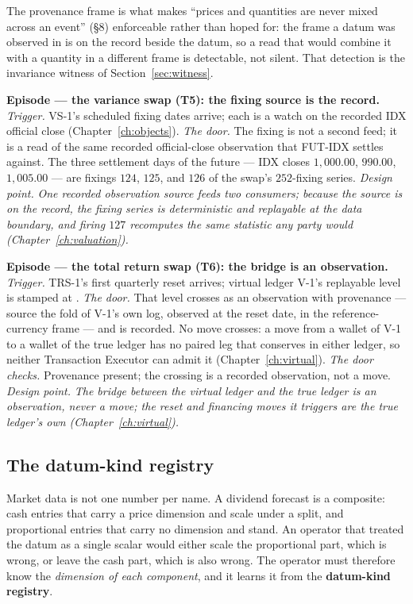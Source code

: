 The provenance frame is what makes ``prices and quantities are never mixed across an
event'' (\S 8) enforceable rather than hoped for: the frame a datum was observed in is on
the record beside the datum, so a read that would combine it with a quantity in a
different frame is detectable, not silent. That detection is the invariance witness of
Section~\ref{sec:witness}.

\medskip\noindent\textbf{Episode --- the variance swap (T5): the fixing source is the
record.}
\emph{Trigger.} VS-1's scheduled fixing dates arrive; each is a watch on the recorded IDX
official close (Chapter~\ref{ch:objects}). \emph{The door.} The fixing is not a second
feed; it is a read of the same recorded official-close observation that FUT-IDX settles
against. The three settlement days of the future --- IDX closes $1{,}000.00$, $990.00$,
$1{,}005.00$ --- are fixings $124$, $125$, and $126$ of the swap's $252$-fixing series.
\emph{Design point.} \emph{One recorded observation source feeds two consumers; because
the source is on the record, the fixing series is deterministic and replayable at the data
boundary, and firing $127$ recomputes the same statistic any party would
(Chapter~\ref{ch:valuation}).}

\medskip\noindent\textbf{Episode --- the total return swap (T6): the bridge is an
observation.}
\emph{Trigger.} TRS-1's first quarterly reset arrives; virtual ledger V-1's replayable
level is stamped at . \emph{The door.} That level crosses as an
observation with provenance --- source the fold of V-1's own log, observed at the reset
date, in the reference-currency frame --- and is recorded. No move crosses: a move from a
wallet of V-1 to a wallet of the true ledger has no paired leg that conserves in either
ledger, so neither Transaction Executor can admit it (Chapter~\ref{ch:virtual}). \emph{The
door checks.} Provenance present; the crossing is a recorded observation, not a move.
\emph{Design point.} \emph{The bridge between the virtual ledger and the true ledger is an
observation, never a move; the reset and financing moves it triggers are the true ledger's
own (Chapter~\ref{ch:virtual}).}

\subsection{The datum-kind registry}\label{sec:registry}

Market data is not one number per name. A dividend forecast is a composite: cash entries
that carry a price dimension and scale under a split, and proportional entries that carry
no dimension and stand. An operator that treated the datum as a single scalar would either
scale the proportional part, which is wrong, or leave the cash part, which is also wrong.
The operator must therefore know the \emph{dimension of each component}, and it learns it
from the \textbf{datum-kind registry}.

